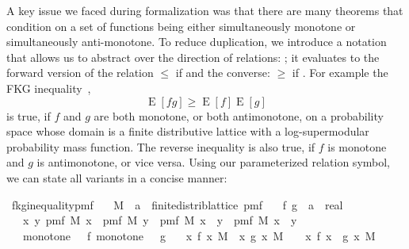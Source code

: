 \documentclass[a4paper,UKenglish,cleveref, autoref, thm-restate]{lipics-v2021}
\DeclareMathOperator{\expect}{\mathrm{E}}
\newenvironment{isabelle_cm}{\begin{mdframed}[backgroundcolor=shadecolor,nobreak=true,linewidth=0]\begin{isabelle}}{\end{isabelle}\end{mdframed}}%
\begin{document}
A key issue we faced during formalization was that there are many theorems that condition on a set of functions being either simultaneously monotone or simultaneously anti-monotone.
To reduce duplication, we introduce a notation that allows us to abstract over the direction of relations: \isa{\isasymle\isasymge\isactrlbsub\isasymeta\isactrlesub}; it evaluates to the forward version of the relation $\leq$ if  and the converse: $\geq$ if .
For example the FKG inequality~\cite[Ch. 6]{alon2000},\cite{fortuin1971}
\[
  \expect [f g] \geq \expect [f] \expect [g]
\]
is true, if $f$ and $g$ are both monotone, or both antimonotone, on a probability space whose domain is a finite distributive lattice with a log-supermodular probability mass function.
The reverse inequality is also true, if $f$ is monotone and $g$ is antimonotone, or vice versa.
Using our parameterized relation symbol, we can state all variants in a concise manner:
\begin{isabelle_cm}
\isamarkupfalse%
\ fkg{\isacharunderscore}{\kern0pt}inequality{\isacharunderscore}{\kern0pt}pmf{\isacharcolon}{\kern0pt}\isanewline
\ \ \ M\ {\isacharcolon}{\kern0pt}{\isacharcolon}{\kern0pt}\ {\isacartoucheopen}{\isacharparenleft}{\kern0pt}{\isacharprime}{\kern0pt}a\ {\isacharcolon}{\kern0pt}{\isacharcolon}{\kern0pt}\ finite{\isacharunderscore}{\kern0pt}distrib{\isacharunderscore}{\kern0pt}lattice{\isacharparenright}{\kern0pt}\ pmf{\isacartoucheclose}\isanewline
\ \ \ f\ g\ {\isacharcolon}{\kern0pt}{\isacharcolon}{\kern0pt}\ {\isacartoucheopen}{\isacharprime}{\kern0pt}a\ {\isasymRightarrow}\ real{\isacartoucheclose}\isanewline
\ \ \ {\isacartoucheopen}{\isasymAnd}x\ y{\isachardot}{\kern0pt}\ pmf\ M\ x\ {\isacharasterisk}{\kern0pt}\ pmf\ M\ y\ {\isasymle}\ pmf\ M\ {\isacharparenleft}{\kern0pt}x\ {\isasymsqunion}\ y{\isacharparenright}{\kern0pt}\ {\isacharasterisk}{\kern0pt}\ pmf\ M\ {\isacharparenleft}{\kern0pt}x\ {\isasymsqinter}\ y{\isacharparenright}{\kern0pt}{\isacartoucheclose}\isanewline
\ \ \ {\isacartoucheopen}monotone\ {\isacharparenleft}{\kern0pt}{\isasymle}{\isacharparenright}{\kern0pt}\ {\isacharparenleft}{\kern0pt}{\isasymle}{\isasymge}\isactrlbsub {\isasymtau}\isactrlesub {\isacharparenright}{\kern0pt}\ f{\isacartoucheclose}\ {\isacartoucheopen}monotone\ {\isacharparenleft}{\kern0pt}{\isasymle}{\isacharparenright}{\kern0pt}\ {\isacharparenleft}{\kern0pt}{\isasymle}{\isasymge}\isactrlbsub {\isasymsigma}\isactrlesub {\isacharparenright}{\kern0pt}\ g{\isacartoucheclose}\isanewline
\ \ \ {\isacartoucheopen}{\isacharparenleft}{\kern0pt}{\isasymintegral}x{\isachardot}{\kern0pt}\ f\ x\ {\isasympartial}M{\isacharparenright}{\kern0pt}\ {\isacharasterisk}{\kern0pt}\ {\isacharparenleft}{\kern0pt}{\isasymintegral}x{\isachardot}{\kern0pt}\ g\ x\ {\isasympartial}M{\isacharparenright}{\kern0pt}\ {\isasymle}{\isasymge}\isactrlbsub {\isasymtau}\ {\isacharasterisk}{\kern0pt}\ {\isasymsigma}\isactrlesub \ {\isacharparenleft}{\kern0pt}{\isasymintegral}x{\isachardot}{\kern0pt}\ f\ x\ {\isacharasterisk}{\kern0pt}\ g\ x\ {\isasympartial}M{\isacharparenright}{\kern0pt}{\isacartoucheclose}
\end{isabelle_cm}
\end{document}
